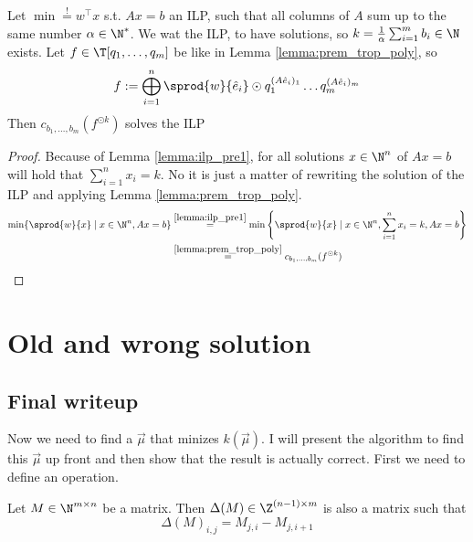 \begin{theorem}
    Let $\min \stackrel{!}{=} w^\top x$ s.t. $Ax=b$ an ILP, such that all columns of $A$ sum up to the same number $\alpha \in \N^*$. We wat the ILP, to have solutions, so $k = \frac{1}{\alpha}\sum_{i=1}^{m}b_i \in \N$ exists. Let $f \in \T[q_1, \dots, q_m]$ be like in Lemma \ref{lemma:prem_trop_poly}, so 
    $$f := \bigoplus_{i=1}^{n} \sprod{w}{\hat e_i}\odot  q_1^{(A\hat e_i)_1}\dots q_m^{(A\hat e_i)_m}$$
    Then $c_{b_1, \dots, b_m}(f^{\odot k})$ solves the ILP 
\end{theorem}

\begin{proof}
    Because of Lemma \ref{lemma:ilp_pre1}, for all solutions $x \in \N^n$ of $Ax=b$ will hold that $\sum_{i=1}^{n}x_i = k$. No it is just a matter of rewriting the solution of the ILP and applying Lemma \ref{lemma:prem_trop_poly}.
    \begin{align*}
        \min\{\sprod{w}{x} \mid x \in \N^n, Ax=b\} &\stackrel{\ref{lemma:ilp_pre1}}{=} \min\left\{\sprod{w}{x} \mid x \in \N^n, \sum_{i=1}^{n}x_i = k , Ax=b\right\}\\
        &\stackrel{\ref{lemma:prem_trop_poly}}{=} c_{b_1, \dots, b_m}(f^{\odot k})
    \end{align*}
\end{proof}

\section{Old and wrong solution}
\subsection{Final writeup}
Now we need to find a $\vec\mu$ that minizes $k(\vec\mu)$. I will present the algorithm to find this $\vec\mu$ up front and then show that the result is actually correct. First we need to define an operation. 
\begin{definition}
    Let $M \in \N^{m\times n}$ be a matrix. Then $\Delta(M) \in \Z^{(n-1)\times m}$ is also a matrix such that 
    $$\Delta(M)_{i,j} = M_{j,i} - M_{j,i+1}$$
\end{definition}

